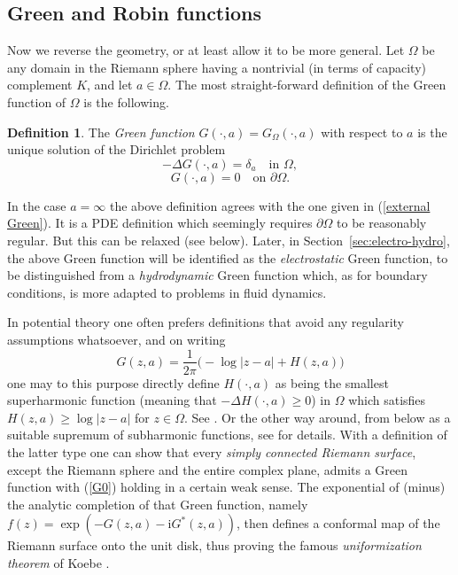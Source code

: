 \documentclass[reqno,12pt]{article}
\theoremstyle{plain}
\theoremstyle{definition}
\newtheorem{definition}{Definition}[section]
\numberwithin{equation}{section}
\numberwithin{figure}{section}
\def\I{\mathrm{i}}
\begin{document}

\subsection{Green and Robin functions}\label{sec:Green and Robin}

Now we reverse the geometry, or at least allow it to be more general.
Let $\Omega$ be any domain in the Riemann sphere having a nontrivial (in terms of capacity)
complement $K$, and let $a\in\Omega$. The most straight-forward definition of the Green function
of $\Omega$ is the following. 
\begin{definition}\label{def:Green}
The {\it Green function} $G(\cdot,a)=G_\Omega (\cdot,a)$ 
with respect to $a$ is the unique solution of the Dirichlet problem
\begin{equation}\label{DeltaG}
-\Delta G (\cdot,a)=\delta_{a} \quad \text{in }\Omega,
\end{equation}
\begin{equation}\label{G0}
G(\cdot,a)=0 \quad \text{on }\partial\Omega.
\end{equation}
\end{definition}

In the case $a=\infty$ the above definition agrees with the one given in (\ref{external Green}).
It is a PDE definition which seemingly requires  $\partial\Omega$ to be reasonably regular.
But this can be relaxed (see below). 
Later, in Section~\ref{sec:electro-hydro}, the above Green function will be identified as the {\it electrostatic} Green function, 
to be distinguished
from a {\it hydrodynamic} Green function which, as for boundary conditions, is more adapted to problems in fluid dynamics. 

In potential theory one often prefers definitions that avoid
any regularity assumptions whatsoever, and on writing
\begin{equation}\label{GlogH}
G(z,a)=\frac{1}{2\pi}\big(- \log {|z-a|}+H(z,a)\big)
\end{equation}
one may to this purpose directly define $H(\cdot,a)$ as being the smallest superharmonic function 
(meaning that $-\Delta H(\cdot,a)\geq 0$) in $\Omega$ which satisfies $H(z,a)\geq \log|z-a|$ for $z\in\Omega$. 
See \cite{Doob-1984}. Or the other way around,  from below as a suitable supremum of subharmonic functions,
see \cite{Ahlfors-1973, Farkas-Kra-1992} for details.
With a definition of the latter type one can show that every {\it simply connected Riemann surface}, except the Riemann sphere
and the entire complex plane, admits a Green function with (\ref{G0}) holding in a certain weak sense. 
The exponential of (minus) the analytic completion
of that Green function, namely $f(z)=\exp{(-G(z,a)-\I G^*(z,a))}$, then defines a 
conformal map of the Riemann surface onto the unit disk, thus proving the famous {\it uniformization theorem} of
Koebe \cite{Koebe-1918}. 
\end{document}
